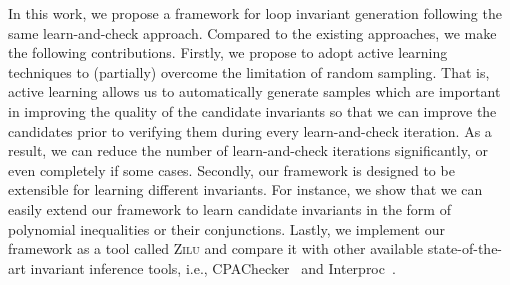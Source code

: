 In this work, we propose a framework for loop invariant generation following the same learn-and-check approach. %
Compared to the existing approaches, we make the following contributions. Firstly, we propose to adopt active learning techniques to (partially) overcome the limitation of random sampling. That is, active learning allows us to automatically generate samples which are important in improving the quality of the candidate invariants so that we can improve the candidates prior to verifying them during every learn-and-check iteration. As a result, we can reduce the number of learn-and-check iterations significantly, or even completely if some cases.
Secondly, our framework is designed to be extensible for learning different invariants. For instance, we show that we can easily extend our framework to learn candidate invariants in the form of polynomial inequalities or their conjunctions.
Lastly, we implement our framework as a tool called \textsc{Zilu}
    and compare it with other available state-of-the-art invariant inference tools,
    i.e., CPAChecker~\cite{beyer2011cpachecker} and Interproc~\cite{jeannet2010interproc}.
